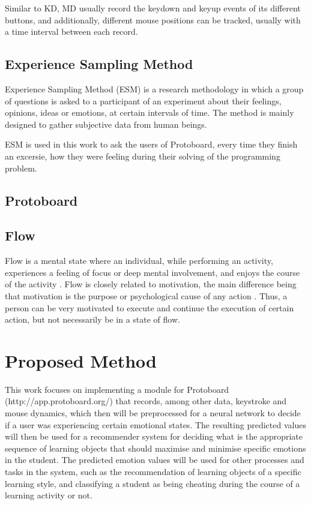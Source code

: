 \documentclass{acm_proc_article-sp}
\begin{document}
Similar to KD, MD usually record the keydown and keyup events of its
different buttons, and additionally, different mouse positions can be
tracked, usually with a time interval between each record.


\subsection{Experience Sampling Method}
\label{ESM}

Experience Sampling Method (ESM) is a research methodology in which a
group of questions is asked to a participant of an experiment about
their feelings, opinions, ideas or emotions, at certain intervals of
time. The method is mainly designed to gather subjective data from
human beings.

ESM is used in this work to ask the users of Protoboard, every time
they finish an excersie, how they were feeling during their solving of
the programming problem.


\subsection{Protoboard}

\subsection{Flow}

Flow is a mental state where an individual, while performing an
activity, experiences a feeling of focus or deep mental
involvement, and enjoys the course of the activity \cite{cit:4}. Flow
is closely related to motivation, the main difference being that
motivation is the purpose or psychological cause of any action
\cite{cit:16}. Thus, a person can be very motivated to execute and
continue the execution of certain action, but not necessarily be in a
state of flow.


\section{Proposed Method}

This work focuses on implementing a module for Protoboard (http://app.protoboard.org/) that
records, among other data, keystroke and mouse dynamics, which then
will be preprocessed for a neural network to decide if a user was
experiencing certain emotional states. The resulting predicted values
will then be used for a recommender system for deciding what is the
appropriate sequence of learning objects that should maximise and
minimise specific emotions in the student. The predicted emotion
values will be used for other processes and tasks in the system, such
as the recommendation of learning objects of a specific learning
style, and classifying a student as being cheating during the course
of a learning activity or not.
\end{document}

